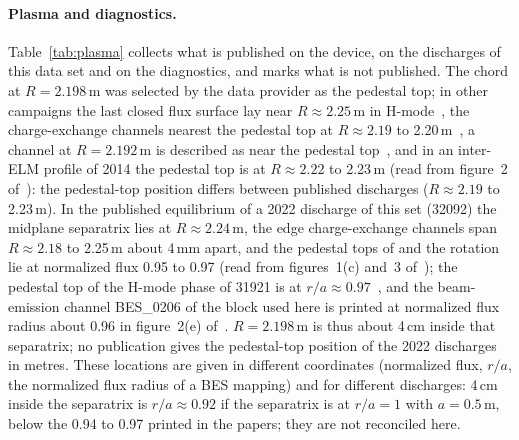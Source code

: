 \paragraph{Plasma and diagnostics.} Table~\ref{tab:plasma} collects what is published on
the device, on the discharges of this data set and on the diagnostics, and marks what is
not published. The chord at $R = 2.198$\,m was selected by the data provider as the
pedestal top; in other campaigns the last closed flux surface lay near $R \approx 2.25$\,m
in H-mode~\citep{Ko2015IonTemperature}, the charge-exchange channels nearest the pedestal
top at $R \approx 2.19$ to 2.20\,m~\citep{Kim2020PedestalElectron}, a channel at
$R = 2.192$\,m is described as near the pedestal top~\citep{Lee2026NeuralNetworkbased},
and in an inter-ELM profile of 2014 the \Ti{} pedestal top is at $R \approx 2.22$ to
2.23\,m (read from figure~2 of~\citep{Ko2016CharacteristicsToroidal}): the pedestal-top
position differs between published discharges ($R \approx 2.19$ to 2.23\,m).
In the published equilibrium of a 2022 discharge of this set (32092) the midplane
separatrix lies at $R \approx 2.24$\,m, the edge charge-exchange channels span
$R \approx 2.18$ to 2.25\,m about 4\,mm apart, and the pedestal tops of \Ti{} and the
rotation lie at normalized flux 0.95 to 0.97 (read from figures~1(c) and~3
of~\citep{Lee2026SpatiotemporalStructure}); the \Ti{} pedestal top of the H-mode phase of
31921 is at $r/a \approx 0.97$~\citep{Na2026FireMode}, and the beam-emission channel
BES\_0206 of the block used here is printed at normalized flux radius about 0.96 in
figure~2(e) of~\citep{Heo2025ExperimentalIdentification}. $R = 2.198$\,m is thus about
4\,cm inside that separatrix; no publication gives the pedestal-top position of the 2022
discharges in metres. These locations are given in different coordinates (normalized
flux, $r/a$, the normalized flux radius of a BES mapping) and for different discharges: 4\,cm
inside the separatrix is $r/a \approx 0.92$ if the separatrix is at $r/a = 1$ with
$a = 0.5$\,m, below the 0.94 to 0.97 printed in the papers; they are not reconciled here.

